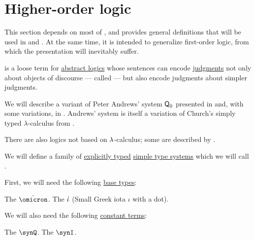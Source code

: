 \section{Higher-order logic}\label{sec:higher_order_logic}

This section depends on most of , and provides general definitions that will be used in  and . At the same time, it is intended to generalize first-order logic, from which the presentation will inevitably suffer.

\begin{concept}\label{con:higher_order_logic}
   is a loose term for \hyperref[def:abstract_logic]{abstract logics} whose sentences can encode \hyperref[con:judgment]{judgments} not only about objects of discourse --- called  --- but also encode judgments about simpler judgments.

  We will describe a variant of Peter Andrews' system \( \textsf{Q}_0 \) presented in \cite[\S 51]{Andrews2002Logic} and, with some variations, in . Andrews' system is itself a variation of Church's simply typed \( \lambda \)-calculus from \cite{Church1940STT}.

  There are also logics not based on \( {\mathrm \lambda} \)-calculus; some are described by .
\end{concept}

\begin{definition}\label{def:simply_typed_hol}\mimprovised
  We will define a family of \hyperref[def:simple_type_system_style]{explicitly typed} \hyperref[def:simple_type_system]{simple type systems} which we will call .

  First, we will need the following \hyperref[def:simple_type]{base types}:
  \begin{thmenum}[series=def:simply_typed_hol]
     The  \( \syn\omicron \).
     The  \( \dot{\iota} \) (Small Greek iota \( \iota \) with a dot).
  \end{thmenum}

  We will also need the following \hyperref[def:lambda_term]{constant terms}:
  \begin{thmenum}[resume=def:simply_typed_hol]
     The  \( \synQ \).
     The  \( \synI \).
  \end{thmenum}

\end{definition}

\begin{definition}\label{def:nth_order_logic}
\end{definition}
